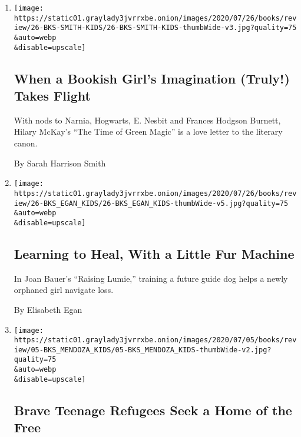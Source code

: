 \begin{enumerate}
\def\labelenumi{\arabic{enumi}.}
\item
  \href{/2020/07/24/books/review/hilary-mckay-the-time-of-green-magic.html}{}

  \texttt{[image: https://static01.graylady3jvrrxbe.onion/images/2020/07/26/books/review/26-BKS-SMITH-KIDS/26-BKS-SMITH-KIDS-thumbWide-v3.jpg?quality=75\\\&auto=webp\\\&disable=upscale]}

  \hypertarget{when-a-bookish-girls-imagination-truly-takes-flight}{%
  \subsection{When a Bookish Girl's Imagination (Truly!) Takes
  Flight}\label{when-a-bookish-girls-imagination-truly-takes-flight}}

  With nods to Narnia, Hogwarts, E. Nesbit and Frances Hodgson Burnett,
  Hilary McKay's ``The Time of Green Magic'' is a love letter to the
  literary canon.

  By Sarah Harrison Smith
\item
  \href{/2020/07/18/books/review/joan-bauer-raising-lumie.html}{}

  \texttt{[image: https://static01.graylady3jvrrxbe.onion/images/2020/07/26/books/review/26-BKS\_EGAN\_KIDS/26-BKS\_EGAN\_KIDS-thumbWide-v5.jpg?quality=75\\\&auto=webp\\\&disable=upscale]}

  \hypertarget{learning-to-heal-with-a-little-fur-machine}{%
  \subsection{Learning to Heal, With a Little Fur
  Machine}\label{learning-to-heal-with-a-little-fur-machine}}

  In Joan Bauer's ``Raising Lumie,'' training a future guide dog helps a
  newly orphaned girl navigate loss.

  By Elisabeth Egan
\item
  \href{/2020/06/27/books/review/we-are-not-from-here-jenny-torres-sanchez.html}{}

  \texttt{[image: https://static01.graylady3jvrrxbe.onion/images/2020/07/05/books/review/05-BKS\_MENDOZA\_KIDS/05-BKS\_MENDOZA\_KIDS-thumbWide-v2.jpg?quality=75\\\&auto=webp\\\&disable=upscale]}

  \hypertarget{brave-teenage-refugees-seek-a-home-of-the-free}{%
  \subsection{Brave Teenage Refugees Seek a Home of the
  Free}\label{brave-teenage-refugees-seek-a-home-of-the-free}}


\end{enumerate}
